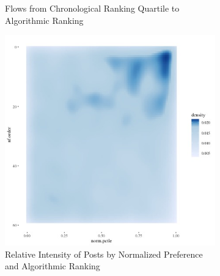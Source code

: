 \documentclass[12pt,letterpaper]{article}
\begin{document}
\begin{figure}[ht]
\begin{subfigure}{.5\textwidth}
\begin{center}
        \caption{Flows from Chronological Ranking Quartile to Algorithmic Ranking}
        \end{center}
         \label{fig:nftime_s}
    \end{subfigure}

   \begin{subfigure}{.5\textwidth} 
        \centering
        \includegraphics[width=1\linewidth]{Output/Graphs/Audit/Heatmaps/US NF norm pref rank by nf rank - smooth.jpg}  
        \caption{Relative Intensity of Posts by Normalized Preference  and Algorithmic Ranking}
        \label{fig:nfpref_hm}
        \end{subfigure}
    \begin{subfigure}{.5\textwidth}
        \centering

\end{subfigure}
\end{figure}
\end{document}
